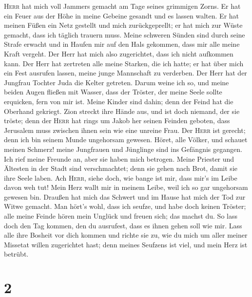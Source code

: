 \textsc{Herr} hat mich voll Jammers gemacht am Tage seines grimmigen
Zorns.  Er hat ein Feuer aus der Höhe in meine Gebeine
gesandt und es lassen walten. Er hat meinen Füßen ein Netz gestellt und
mich zurückgeprellt; er hat mich zur Wüste gemacht, dass ich täglich
trauern muss.  Meine schweren Sünden sind durch seine
Strafe erwacht und in Haufen mir auf den Hals gekommen, dass mir alle
meine Kraft vergeht. Der Herr hat mich also zugerichtet, dass ich nicht
aufkommen kann.  Der Herr hat zertreten alle meine
Starken, die ich hatte; er hat über mich ein Fest ausrufen lassen, meine
junge Mannschaft zu verderben. Der Herr hat der Jungfrau Tochter Juda
die Kelter getreten.  Darum weine ich so, und meine
beiden Augen fließen mit Wasser, dass der Tröster, der meine Seele
sollte erquicken, fern von mir ist. Meine Kinder sind dahin; denn der
Feind hat die Oberhand gekriegt.  Zion streckt ihre Hände
aus, und ist doch niemand, der sie tröste; denn der \textsc{Herr} hat
rings um Jakob her seinen Feinden geboten, dass Jerusalem muss zwischen
ihnen sein wie eine unreine Frau.  Der \textsc{Herr} ist
gerecht; denn ich bin seinem Munde ungehorsam gewesen. Höret, alle
Völker, und schauet meinen Schmerz! meine Jungfrauen und Jünglinge sind
ins Gefängnis gegangen.  Ich rief meine Freunde an, aber
sie haben mich betrogen. Meine Priester und Ältesten in der Stadt sind
verschmachtet; denn sie gehen nach Brot, damit sie ihre Seele laben.
 Ach \textsc{Herr}, siehe doch, wie bange ist mir, dass
mir's im Leibe davon weh tut! Mein Herz wallt mir in meinem Leibe, weil
ich so gar ungehorsam gewesen bin. Draußen hat mich das Schwert und im
Hause hat mich der Tod zur Witwe gemacht.  Man hört's
wohl, dass ich seufze, und habe doch keinen Tröster; alle meine Feinde
hören mein Unglück und freuen sich; das machst du. So lass doch den Tag
kommen, den du ausrufest, dass es ihnen gehen soll wie mir.
 Lass alle ihre Bosheit vor dich kommen und richte sie
zu, wie du mich um aller meiner Missetat willen zugerichtet hast; denn
meines Seufzens ist viel, und mein Herz ist betrübt.

\hypertarget{section-1}{%
\section{2}\label{section-1}}

